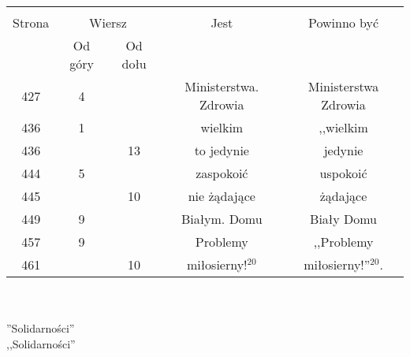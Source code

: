 \documentclass[a4paper,11pt]{article}
\begin{document}
\begin{center}
  \begin{tabular}{|c|c|c|c|c|}
    \hline
    & \multicolumn{2}{c|}{} & & \\
    Strona & \multicolumn{2}{c|}{Wiersz} & Jest
                              & Powinno być \\ \cline{2-3}
    & Od góry & Od dołu & & \\
    \hline
    427 &  4 & & Ministerstwa. Zdrowia & Ministerstwa Zdrowia \\
    436 &  1 & & wielkim & ,,wielkim  %
    \\
    436 & & 13 & to jedynie & jedynie \\
    444 &  5 & & zaspokoić & uspokoić \\
    445 & & 10 & nie żądające & żądające \\
    449 &  9 & & Białym. Domu & Biały Domu \\
    457 &  9 & & Problemy & ,,Problemy  %
    \\
    461 & & 10 & miłosierny!$^{ 20 }$ & miłosierny!''$^{ 20 }$. \\
    \hline
  \end{tabular}
\end{center}
\noi \\
 \\
\Jest ''Solidarności'' \\
\Pow  ,,Solidarności'' \\
 \\
\Jest {} \\
\Pow  {} \\
 \\
\Jest {} \\
\Pow  {} \\

\vspace{\spaceTwo}





\newpage
{}

\vspace{\spaceTwo} \vspace{\spaceThree}
\end{document}
